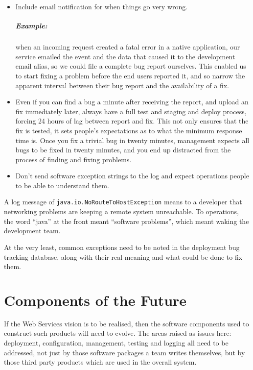\documentclass[draft]{report}
\begin{document}
\begin{itemize}
\item Include email notification for when things go very wrong.

\paragraph{Example:} when an incoming request created a fatal error in a
native application, our service emailed the event and the data that
caused it to the development email alias, so we could file a complete
bug report ourselves. This enabled us to start fixing a problem before
the end users reported it, and so narrow the apparent interval between
their bug report and the availability of a fix.

\item Even if you can find a bug a minute after receiving the report,
and upload an fix immediately later, always have a full test and staging
and deploy process, forcing 24 hours of lag between report and fix. This
not only ensures that the fix is tested, it sets people's expectations
as to what the minimum response time is. Once you fix a trivial bug in
twenty minutes, management expects all bugs to be fixed in twenty
minutes, and you end up distracted from the process of finding and
fixing problems.

\item Don't send software exception strings to the log and expect
operations people to be able to understand them.

\end{itemize}

A log message of \verb|java.io.NoRouteToHostException| means to a
developer that networking problems are keeping a remote system
unreachable. To operations, the word ``java'' at the front meant
``software problems'', which meant waking the development team.

At the very least, common exceptions need to be noted in the deployment
bug tracking database, along with their real meaning and what could be
done to fix them.

\chapter{Components of the Future}

If the Web Services vision is to be realised, then the software
components used to construct such products will need to evolve. The
areas raised as issues here: deployment, configuration, management,
testing and logging all need to be addressed, not just by those software
packages a team writes themselves, but by those third party products
which are used in the overall system.
\end{document}

